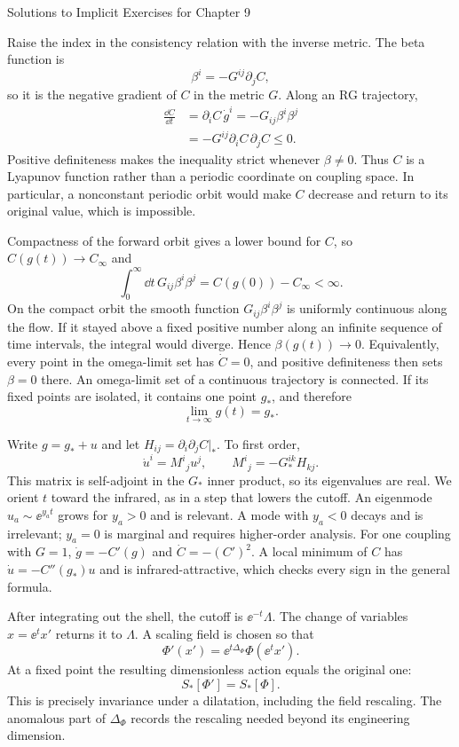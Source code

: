 \begin{bankssolutions}{Solutions to Implicit Exercises for Chapter 9}

Raise the index in the consistency relation with the inverse metric.  The beta
function is
\[
  \beta^i=-G^{ij}\partial_jC,
\]
so it is the negative gradient of $C$ in the metric $G$.  Along an RG
trajectory,
\begin{align*}
  \frac{\dd C}{\dd t}
  &=\partial_iC\,\dot g^i
   =-G_{ij}\beta^i\beta^j\\
  &=-G^{ij}\partial_iC\,\partial_jC\leq0.
\end{align*}
Positive definiteness makes the inequality strict whenever $\beta\ne0$.
Thus $C$ is a Lyapunov function rather than a periodic coordinate on coupling
space.  In particular, a nonconstant periodic orbit would make $C$ decrease
and return to its original value, which is impossible.

Compactness of the forward orbit gives a lower bound for $C$, so
$C(g(t))\to C_\infty$ and
\[
  \int_0^\infty\dd t\,
  G_{ij}\beta^i\beta^j=C(g(0))-C_\infty<\infty.
\]
On the compact orbit the smooth function
$G_{ij}\beta^i\beta^j$ is uniformly continuous along the flow.  If it stayed
above a fixed positive number along an infinite sequence of time intervals,
the integral would diverge.  Hence $\beta(g(t))\to0$.  Equivalently, every
point in the omega-limit set has $\dot C=0$, and positive definiteness then
sets $\beta=0$ there.  An omega-limit set of a continuous trajectory is
connected.  If its fixed points are isolated, it contains one point $g_*$,
and therefore
\[
  \lim_{t\to\infty}g(t)=g_*.
\]

Write $g=g_*+u$ and let $H_{ij}=\partial_i\partial_jC|_*$.  To first order,
\[
  \dot u^i=M^i{}_ju^j,
  \qquad M^i{}_j=-G_*^{ik}H_{kj}.
\]
This matrix is self-adjoint in the $G_*$ inner product, so its eigenvalues are
real.  We orient $t$ toward the infrared, as in a step that lowers the cutoff.
An eigenmode $u_a\sim\ee^{y_at}$ grows for $y_a>0$ and is relevant.  A mode
with $y_a<0$ decays and is irrelevant; $y_a=0$ is marginal and requires
higher-order analysis.  For one coupling with $G=1$, $\dot g=-C'(g)$ and
$\dot C=-(C')^2$.  A local minimum of $C$ has
$\dot u=-C''(g_*)u$ and is infrared-attractive, which checks every sign in the
general formula.

After integrating out the shell, the cutoff is $\ee^{-t}\Lambda$.  The change
of variables $x=\ee^t x'$ returns it to $\Lambda$.  A scaling field is chosen
so that
\[
  \Phi'(x')=\ee^{t\Delta_\Phi}\Phi(\ee^t x').
\]
At a fixed point the resulting dimensionless action equals the original one:
\[
  S_*[\Phi']=S_*[\Phi].
\]
This is precisely invariance under a dilatation, including the field
rescaling.  The anomalous part of $\Delta_\Phi$ records the rescaling needed
beyond its engineering dimension.


\end{bankssolutions}

